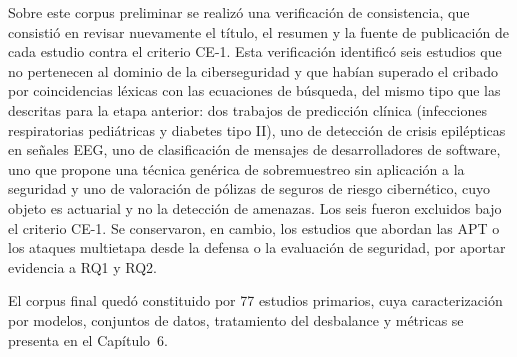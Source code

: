 Sobre este corpus preliminar se realizó una verificación de consistencia, que consistió en revisar nuevamente el título, el resumen y la fuente de publicación de cada estudio contra el criterio CE-1. Esta verificación identificó seis estudios que no pertenecen al dominio de la ciberseguridad y que habían superado el cribado por coincidencias léxicas con las ecuaciones de búsqueda, del mismo tipo que las descritas para la etapa anterior: dos trabajos de predicción clínica (infecciones respiratorias pediátricas y diabetes tipo II), uno de detección de crisis epilépticas en señales EEG, uno de clasificación de mensajes de desarrolladores de software, uno que propone una técnica genérica de sobremuestreo sin aplicación a la seguridad y uno de valoración de pólizas de seguros de riesgo cibernético, cuyo objeto es actuarial y no la detección de amenazas. Los seis fueron excluidos bajo el criterio CE-1. Se conservaron, en cambio, los estudios que abordan las APT o los ataques multietapa desde la defensa o la evaluación de seguridad, por aportar evidencia a RQ1 y RQ2.

El corpus final quedó constituido por 77 estudios primarios, cuya caracterización por modelos, conjuntos de datos, tratamiento del desbalance y métricas se presenta en el Capítulo~6.


